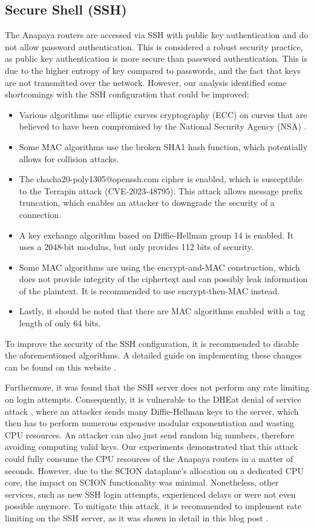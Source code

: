 \subsection{Secure Shell (SSH)}
The Anapaya routers are accessed via SSH with public key authentication and do not allow password authentication.
This is considered a robust security practice, as public key authentication is more secure than password authentication.
This is due to the higher entropy of key compared to passwords, and the fact that keys are not transmitted over the network.
However, our analysis identified some shortcomings with the SSH configuration that could be improved:

\begin{itemize}
    \item Various algorithms use elliptic curves cryptography (ECC) on curves that are believed to have been compromised by the National Security Agency (NSA) \cite{nist1_safecurves}.
    \item Some MAC algorithms use the broken SHA1 hash function, which potentially allows for collision attacks.
    \item The chacha20-poly1305@openssh.com cipher is enabled, which is susceptible to the Terrapin attack (CVE-2023-48795).
    This attack allows message prefix truncation, which enables an attacker to downgrade the security of a connection.
    \item A key exchange algorithm based on Diffie-Hellman group 14 is enabled. It uses a 2048-bit modulus, but only provides 112 bits of security.
    \item Some MAC algorithms are using the encrypt-and-MAC construction, which does not provide integrity of the ciphertext and can possibly leak information of the plaintext.
    It is recommended to use encrypt-then-MAC instead.
    \item Lastly, it should be noted that there are MAC algorithms enabled with a tag length of only 64 bits.
\end{itemize}

To improve the security of the SSH configuration, it is recommended to disable the aforementioned algorithms.
A detailed guide on implementing these changes can be found on this website \cite{sshauditHardeningGuides}.


Furthermore, it was found that the SSH server does not perform any rate limiting on login attempts.
Consequently, it is vulnerable to the DHEat denial of service attack \cite{dheatAttack}, where an attacker sends many Diffie-Hellman keys to the server, which then has to perform numerous expensive modular exponentiation and wasting CPU resources.
An attacker can also just send random big numbers, therefore avoiding computing valid keys.
Our experiments demonstrated that this attack could fully consume the CPU resources of the Anapaya routers in a matter of seconds.
However, due to the SCION dataplane's allocation on a dedicated CPU core, the impact on SCION functionality was minimal.
Nonetheless, other services, such as new SSH login attempts, experienced delays or were not even possible anymore.
To mitigate this attack, it is recommended to implement rate limiting on the SSH server, as it was shown in detail in this blog post \cite{dheatAnalysis}.


